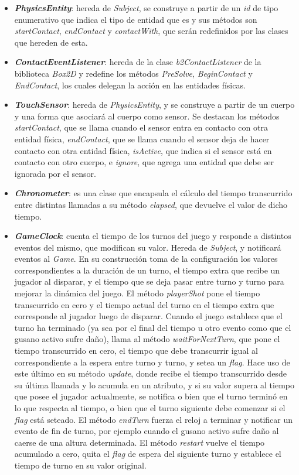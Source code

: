\begin{itemize}
	\item \textbf{\textit{PhysicsEntity}}: hereda de \textit{Subject}, se construye a partir de un \textit{id} de tipo enumerativo que indica el tipo de entidad que es y sus métodos son \textit{startContact}, \textit{endContact} y \textit{contactWith}, que serán redefinidos por las clases que hereden de esta.
	
	\item \textbf{\textit{ContactEventListener}}: hereda de la clase \textit{b2ContactListener} de la biblioteca \textit{Box2D} y redefine los métodos \textit{PreSolve}, \textit{BeginContact} y \textit{EndContact}, los cuales delegan la acción en las entidades físicas.
	
	\item \textbf{\textit{TouchSensor}}: hereda de \textit{PhysicsEntity}, y se construye a partir de un cuerpo y una forma que asociará al cuerpo como sensor. Se destacan los métodos \textit{startContact}, que se llama cuando el sensor entra en contacto con otra entidad física, \textit{endContact}, que se llama cuando el sensor deja de hacer contacto con otra entidad física, \textit{isActive}, que indica si el sensor está en contacto con otro cuerpo, e \textit{ignore}, que agrega una entidad que debe ser ignorada por el sensor.
	
	\item \textbf{\textit{Chronometer}}: es una clase que encapsula el cálculo del tiempo transcurrido entre distintas llamadas a su método \textit{elapsed}, que devuelve el valor de dicho tiempo.
	
	\item \textbf{\textit{GameClock}}: cuenta el tiempo de los turnos del juego y responde a distintos eventos del mismo, que modifican su valor. Hereda de \textit{Subject}, y notificará eventos al \textit{Game}. En su construcción toma de la configuración los valores correspondientes a la duración de un turno, el tiempo extra que recibe un jugador al disparar, y el tiempo que se deja pasar entre turno y turno para mejorar la dinámica del juego. El método \textit{playerShot} pone el tiempo transcurrido en cero y el tiempo actual del turno en el tiempo extra que corresponde al jugador luego de disparar. Cuando el juego establece que el turno ha terminado (ya sea por el final del tiempo u otro evento como que el gusano activo sufre daño), llama al método \textit{waitForNextTurn}, que pone el tiempo transcurrido en cero, el tiempo que debe transcurrir igual al correspondiente a la espera entre turno y turno, y setea un \textit{flag}. Hace uso de este último en su método \textit{update}, donde recibe el tiempo transcurrido desde su última llamada y lo acumula en un atributo, y si su valor supera al tiempo que posee el jugador actualmente, se notifica o bien que el turno terminó en lo que respecta al tiempo, o bien que el turno siguiente debe comenzar si el \textit{flag} está seteado. El método \textit{endTurn} fuerza el reloj a terminar y notificar un evento de fin de turno, por ejemplo cuando el gusano activo sufre daño al caerse de una altura determinada. El método \textit{restart} vuelve el tiempo acumulado a cero, quita el \textit{flag} de espera del siguiente turno y establece el tiempo de turno en su valor original.
	

\end{itemize}
